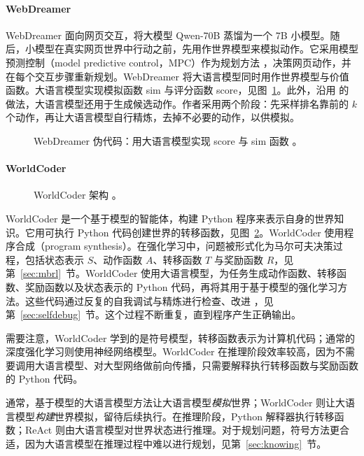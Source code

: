 \paragraph{WebDreamer}
WebDreamer 面向网页交互，将大模型 Qwen-70B \citep{bai2025qwen2} 蒸馏为一个 7B 小模型。随后，小模型在真实网页世界中行动之前，先用作世界模型来模拟动作。它采用模型预测控制（model predictive control，MPC）作为规划方法 \citep{garcia1989model,schwenzer2021review}，决策网页动作，并在每个交互步骤重新规划。WebDreamer 将大语言模型同时用作世界模型与价值函数。大语言模型实现模拟函数 sim 与评分函数 score，见图~\ref{fig:webdreamer}。此外，沿用 \citep{koh2024tree} 的做法，大语言模型还用于生成候选动作。作者采用两个阶段：先采样排名靠前的 $k$ 个动作，再让大语言模型自行精炼，去掉不必要的动作，以供模拟。

\begin{figure}
    \centering
    
    \caption{WebDreamer 伪代码：用大语言模型实现 score 与 sim 函数 \citep{gu2024your}。}
    \label{fig:webdreamer}
\end{figure}

\paragraph{WorldCoder}
\begin{figure}
    \centering
    
    \caption{WorldCoder 架构 \citep{tang2024worldcoder}。}
    \label{fig:worldcoder}
\end{figure}
WorldCoder 是一个基于模型的智能体，构建 Python 程序来表示自身的世界知识。它用可执行 Python 代码创建世界的转移函数，见图~\ref{fig:worldcoder}。WorldCoder 使用程序合成（program synthesis）。在强化学习中，问题被形式化为马尔可夫决策过程，包括状态表示 $S$、动作函数 $A$、转移函数 $T$ 与奖励函数 $R$，见第~\ref{sec:mbrl}~节。WorldCoder 使用大语言模型，为任务生成动作函数、转移函数、奖励函数以及状态表示的 Python 代码，再将其用于基于模型的强化学习方法。这些代码通过反复的自我调试与精炼进行检查、改进 \citep{chen2023teaching}，见第~\ref{sec:selfdebug}~节。这个过程不断重复，直到程序产生正确输出。

需要注意，WorldCoder 学到的是符号模型，转移函数表示为计算机代码；通常的深度强化学习则使用神经网络模型。WorldCoder 在推理阶段效率较高，因为不需要调用大语言模型、对大型网络做前向传播，只需要解释执行转移函数与奖励函数的 Python 代码。

通常，基于模型的大语言模型方法让大语言模型{\em 模拟}世界；WorldCoder 则让大语言模型{\em 构建}世界模拟，留待后续执行。在推理阶段，Python 解释器执行转移函数；ReAct 则由大语言模型对世界状态进行推理。对于规划问题，符号方法更合适，因为大语言模型在推理过程中难以进行规划，见第~\ref{sec:knowing}~节。

